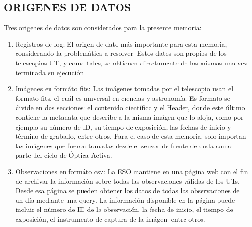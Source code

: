 \subsection{ORIGENES DE DATOS}

Tres origenes de datos son considerados para la presente memoria:

\begin{enumerate}
    \item Registros de log: El origen de dato más importante para esta memoria, considerando la problemática a resolver. Estos datos son propios de los telescopios UT, y como tales, se obtienen directamente de los mismos una vez terminada su ejecución \cite{eso1998vlt}

    \item Imágenes en formáto fits: Las imágenes tomadas por el telescopio usan el formato fits, el cuál es universal en ciencias y astronomía\cite{nasa2025fits}. Es formato se divide en dos secciones: el contenido científico y el Header, donde este último contiene la metadata que describe a la misma imágen que lo aloja, como por ejemplo su número de ID, su tiempo de exposición, las fechas de inicio y término de grabado, entre otros\cite{nasa2025fits}. Para el caso de esta memoria, solo importan las imágenes que fueron tomadas desde el sensor de frente de onda como parte del ciclo de Óptica Activa.


    \item Observaciones en formáto csv: La ESO mantiene en una página web con el fin de archivar la información sobre todas las observaciones válidas de los UTs. Desde esa página se pueden obtener los datos de todas las observaciones de un día mediante una query. La información disponible en la página puede incluir el número de ID de la observación, la fecha de inicio, el tiempo de exposición, el instrumento de captura de la imágen, entre otros.

\end{enumerate}